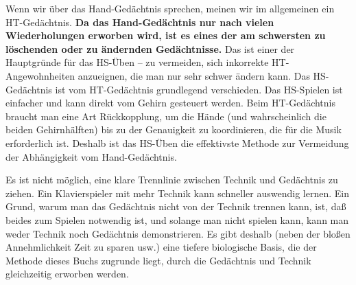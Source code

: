 Wenn wir über das Hand-Gedächtnis sprechen, meinen wir im allgemeinen ein HT-Gedächtnis.
\textbf{Da das Hand-Gedächtnis nur nach vielen Wiederholungen erworben wird, ist es eines der am schwersten zu löschenden oder zu ändernden Gedächtnisse.}
Das ist einer der Hauptgründe für das HS-Üben -- zu vermeiden, sich inkorrekte HT-Angewohnheiten anzueignen, die man nur sehr schwer ändern kann.
Das HS-Gedächtnis ist vom HT-Gedächtnis grundlegend verschieden.
Das HS-Spielen ist einfacher und kann direkt vom Gehirn gesteuert werden.
Beim HT-Gedächtnis braucht man eine Art Rückkopplung, um die Hände (und wahrscheinlich die beiden Gehirnhälften) bis zu der Genauigkeit zu koordinieren, die für die Musik erforderlich ist.
Deshalb ist das HS-Üben die effektivste Methode zur Vermeidung der Abhängigkeit vom Hand-Gedächtnis.

Es ist nicht möglich, eine klare Trennlinie zwischen Technik und Gedächtnis zu ziehen.
Ein Klavierspieler mit mehr Technik kann schneller auswendig lernen.
Ein Grund, warum man das Gedächtnis nicht von der Technik trennen kann, ist, daß beides zum Spielen notwendig ist, und solange man nicht spielen kann, kann man weder Technik noch Gedächtnis demonstrieren.
Es gibt deshalb (neben der bloßen Annehmlichkeit Zeit zu sparen usw.) eine tiefere biologische Basis, die der Methode dieses Buchs zugrunde liegt, durch die Gedächtnis und Technik gleichzeitig erworben werden.
 



